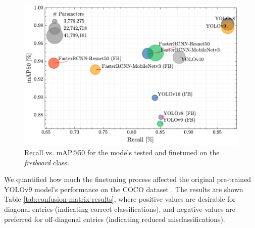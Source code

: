 \documentclass[10pt,twocolumn,letterpaper]{article}
\begin{document}
\begin{figure}[thb]
    \centering
    \includegraphics[width=\columnwidth]{images/final/recall_vs_map50.pdf}
    \caption{Recall vs. mAP@50 for the models tested and finetuned on the \emph{fretboard} class.}
    \label{fig:fretboard-models-recall-map}
\end{figure}


We quantified how much the finetuning process affected the original pre-trained YOLOv9 model's performance on the COCO dataset \cite{lin2015microsoftcococommonobjects}. The results are shown Table \ref{tab:confusion-matrix-results}, where positive values are desirable for diagonal entries (indicating correct classifications), and negative values are preferred for off-diagonal entries (indicating reduced misclassifications).

\end{document}

